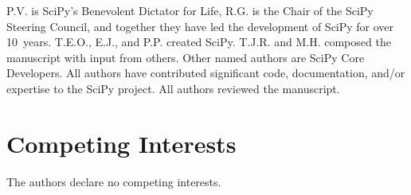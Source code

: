 \documentclass[fleqn,10pt]{wlscirep}
\begin{document}
P.V. is SciPy's Benevolent Dictator for Life, R.G. is the Chair of the SciPy Steering Council, and together they have led the development of SciPy for over 10~years. T.E.O., E.J., and P.P. created SciPy. T.J.R. and M.H. composed the manuscript with input from others. Other named authors are SciPy Core Developers. All authors have contributed significant code, documentation, and/or expertise to the SciPy project. All authors reviewed the manuscript.



\section*{Competing Interests}

The authors declare no competing interests.


\end{document}
